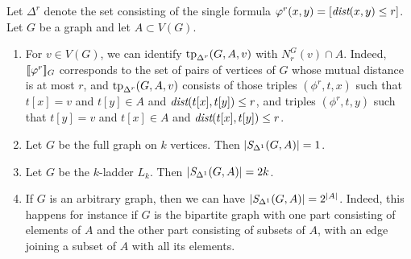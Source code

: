 \begin{example}
	Let $\Delta^r$ denote the set consisting of the single formula 
	$\varphi^r(x,y)=[\textit{dist}(x,y)\le r]$.
	Let $G$ be a graph and let $A\subset V(G)$.

	\begin{enumerate}
		\item For $v\in V(G)$, we can identify $\textrm{tp}_{\Delta^r}(G,A,v)$ with $N_r^G(v)\cap A$. Indeed, $[\![\varphi^r]\!]_G$ corresponds to the set of pairs of vertices of $G$  whose mutual distance is at most $r$,
		and $\textrm{tp}_{\Delta^r}(G,A,v)$ consists of those triples $(\phi^r,t,x)$ such
		that $t[x]=v$ and $t[y]\in A$ and $\textit{dist}(t[x],t[y])\le r$,
		and triples $(\phi^r,t,y)$ such that $t[y]=v$ and $t[x]\in A$
		and $\textit{dist}(t[x],t[y])\le r $.

		\item Let $G$ be the full graph on $k$ vertices.
		Then $|\textit{S}_{\Delta^1}(G,A)|=1$.
		
		\item Let $G$ be the $k$-ladder $L_k$.
				Then $|\textit{S}_{\Delta^1}(G,A)|=2k$.
		
		\item If $G$ is an arbitrary graph, then we can have $|\textit{S}_{\Delta^1}(G,A)|=2^{|A|}$. Indeed, this happens for instance if 
		$G$ is the bipartite graph with one part consisting of elements of $A$
		and the other part consisting of subsets of $A$,
		with an edge joining a subset of $A$ with all its elements. 
		

		
	\end{enumerate}
	
\end{example}